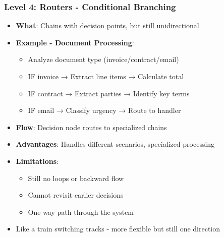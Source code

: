 \begin{frame}[fragile]\frametitle{Level 4: Routers - Conditional Branching}
      \begin{itemize}
        \item \textbf{What}: Chains with decision points, but still unidirectional
        \item \textbf{Example - Document Processing}:
        \begin{itemize}
            \item Analyze document type (invoice/contract/email)
            \item IF invoice → Extract line items → Calculate total
            \item IF contract → Extract parties → Identify key terms
            \item IF email → Classify urgency → Route to handler
        \end{itemize}
        \item \textbf{Flow}: Decision node routes to specialized chains
        \item \textbf{Advantages}: Handles different scenarios, specialized processing
        \item \textbf{Limitations}:
        \begin{itemize}
            \item Still no loops or backward flow
            \item Cannot revisit earlier decisions
            \item One-way path through the system
        \end{itemize}
        \item Like a train switching tracks - more flexible but still one direction
      \end{itemize}
\end{frame}

